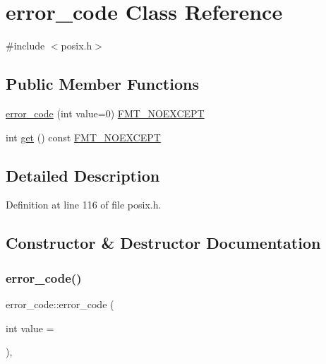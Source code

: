 \hypertarget{classerror__code}{}\section{error\+\_\+code Class Reference}
\label{classerror__code}


{\ttfamily \#include $<$posix.\+h$>$}

\subsection*{Public Member Functions}
\begin{DoxyCompactItemize}
\item 
\hyperlink{classerror__code_a213366e7f3bdbd15b0753c2592d816ed}{error\+\_\+code} (int value=0) \hyperlink{core_8h_aef128913e8400683b1cbd1a3a2e11df3}{F\+M\+T\+\_\+\+N\+O\+E\+X\+C\+E\+PT}
\item 
int \hyperlink{classerror__code_af42e923dd7f4e8451445341eade677c4}{get} () const \hyperlink{core_8h_aef128913e8400683b1cbd1a3a2e11df3}{F\+M\+T\+\_\+\+N\+O\+E\+X\+C\+E\+PT}
\end{DoxyCompactItemize}


\subsection{Detailed Description}


Definition at line 116 of file posix.\+h.



\subsection{Constructor \& Destructor Documentation}
\mbox{\label{classerror__code_a213366e7f3bdbd15b0753c2592d816ed}} 
\subsubsection{\texorpdfstring{error\+\_\+code()}{error\_code()}}
{\footnotesize\ttfamily error\+\_\+code\+::error\+\_\+code (\begin{DoxyParamCaption}\item[{int}]{value = {} }\end{DoxyParamCaption})\hspace{0.3cm}{\ttfamily [inline]}, {\ttfamily [explicit]}}



